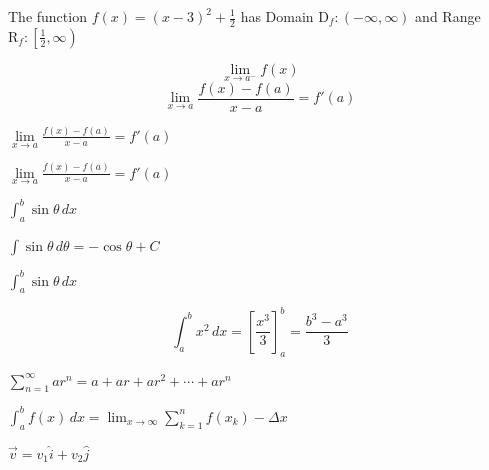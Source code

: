 \documentclass{article}
\begin{document}
The function $ f(x) = (x-3)^2 + \frac{1}{2} $ has Domain $ \mathrm{D}_f : (-\infty,\infty) $ and Range $ \mathrm{R}_f : \left[\frac{1}{2},\infty\right) $

$$ \lim_{x \to a^-} f(x)  $$
$$ \displaystyle\lim_{x \to a} \frac{f(x) - f{(a)}}{x-a} = f'(a)  $$

$ \lim\limits_{x \to a} \frac{f(x) - f{(a)}}{x-a} = f'(a)  $

$ \displaystyle\lim\limits_{x \to a} \frac{f(x) - f{(a)}}{x-a} = f'(a)  $

$ \int_{a}^{b} \sin \theta \,dx  $

$ \int{\sin \theta}\,d\theta = -\cos \theta + C $

$\displaystyle\int_{a}^{b} \sin \theta \,dx  $

$$ \int_{a}^{b} x^2 \,dx = \left[\frac{x^3}{3}\right]_a^b = \frac{b^3 - a^3}{3} $$

$ \displaystyle\sum_{n = 1}^{\infty} ar^n = a + ar + ar^2 + \cdots + ar^n  $

$ \displaystyle\int_{a}^{b} f(x) \,dx = \lim_{x \to \infty}  \sum_{k = 1}^{n} f(x_k) - \Delta x   $

$ \displaystyle\vec{v} = v_1\hat{i} + v_2\hat{j} $
\end{document}

